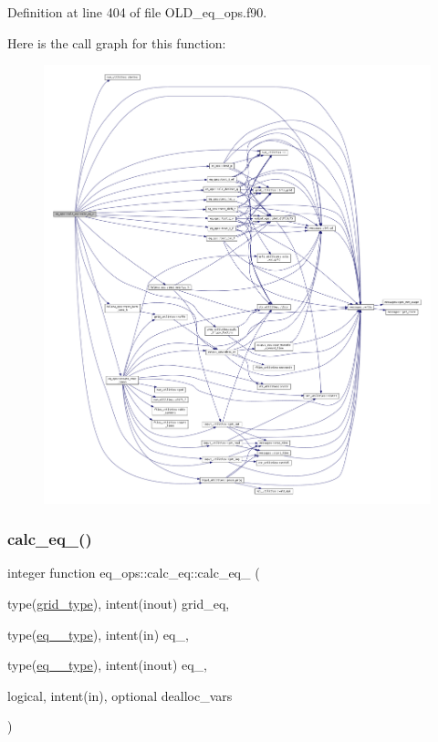 Definition at line 404 of file O\+L\+D\+\_\+eq\+\_\+ops.\+f90.

Here is the call graph for this function\+:
\nopagebreak
\begin{figure}[H]
\begin{center}
\leavevmode
\includegraphics[width=350pt]{interfaceeq__ops_1_1calc__eq_ae2f56ab19ce5c33e863f32e1c9263604_cgraph}
\end{center}
\end{figure}
\mbox{\label{interfaceeq__ops_1_1calc__eq_ae2f56ab19ce5c33e863f32e1c9263604}} 
\subsubsection{\texorpdfstring{calc\+\_\+eq\+\_()}{calc\_eq\_2()}\hspace{0.1cm}{\footnotesize\ttfamily [2/2]}}
{\footnotesize\ttfamily integer function eq\+\_\+ops\+::calc\+\_\+eq\+::calc\+\_\+eq\+\_ (\begin{DoxyParamCaption}\item[{type(\hyperlink{structgrid__vars_1_1grid__type}{grid\+\_\+type}), intent(inout)}]{grid\+\_\+eq,  }\item[{type(\hyperlink{structeq__vars_1_1eq__1__type}{eq\+\_\+1\+\_\+type}), intent(in)}]{eq\+\_,  }\item[{type(\hyperlink{structeq__vars_1_1eq__2__type}{eq\+\_\+2\+\_\+type}), intent(inout)}]{eq\+\_,  }\item[{logical, intent(in), optional}]{dealloc\+\_\+vars }\end{DoxyParamCaption})}



